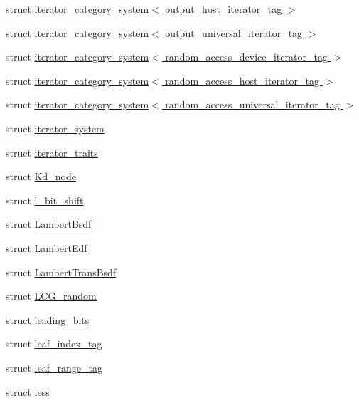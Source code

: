 \begin{DoxyCompactItemize}
\item 
struct \hyperlink{structcugar_1_1iterator__category__system_3_01output__host__iterator__tag_01_4}{iterator\+\_\+category\+\_\+system$<$ output\+\_\+host\+\_\+iterator\+\_\+tag $>$}
\item 
struct \hyperlink{structcugar_1_1iterator__category__system_3_01output__universal__iterator__tag_01_4}{iterator\+\_\+category\+\_\+system$<$ output\+\_\+universal\+\_\+iterator\+\_\+tag $>$}
\item 
struct \hyperlink{structcugar_1_1iterator__category__system_3_01random__access__device__iterator__tag_01_4}{iterator\+\_\+category\+\_\+system$<$ random\+\_\+access\+\_\+device\+\_\+iterator\+\_\+tag $>$}
\item 
struct \hyperlink{structcugar_1_1iterator__category__system_3_01random__access__host__iterator__tag_01_4}{iterator\+\_\+category\+\_\+system$<$ random\+\_\+access\+\_\+host\+\_\+iterator\+\_\+tag $>$}
\item 
struct \hyperlink{structcugar_1_1iterator__category__system_3_01random__access__universal__iterator__tag_01_4}{iterator\+\_\+category\+\_\+system$<$ random\+\_\+access\+\_\+universal\+\_\+iterator\+\_\+tag $>$}
\item 
struct \hyperlink{structcugar_1_1iterator__system}{iterator\+\_\+system}
\item 
struct \hyperlink{structcugar_1_1iterator__traits}{iterator\+\_\+traits}
\item 
struct \hyperlink{structcugar_1_1_kd__node}{Kd\+\_\+node}
\item 
struct \hyperlink{structcugar_1_1l__bit__shift}{l\+\_\+bit\+\_\+shift}
\item 
struct \hyperlink{structcugar_1_1_lambert_bsdf}{Lambert\+Bsdf}
\item 
struct \hyperlink{structcugar_1_1_lambert_edf}{Lambert\+Edf}
\item 
struct \hyperlink{structcugar_1_1_lambert_trans_bsdf}{Lambert\+Trans\+Bsdf}
\item 
struct \hyperlink{structcugar_1_1_l_c_g__random}{L\+C\+G\+\_\+random}
\item 
struct \hyperlink{structcugar_1_1leading__bits}{leading\+\_\+bits}
\item 
struct \hyperlink{structcugar_1_1leaf__index__tag}{leaf\+\_\+index\+\_\+tag}
\item 
struct \hyperlink{structcugar_1_1leaf__range__tag}{leaf\+\_\+range\+\_\+tag}
\item 
struct \hyperlink{structcugar_1_1less}{less}
\item 

\end{DoxyCompactItemize}
